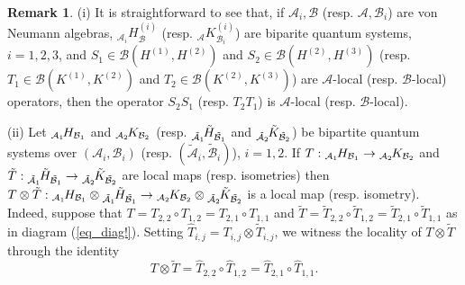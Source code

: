 \documentclass[11pt]{amsart}
\theoremstyle{definition}
\newtheorem{remark}[theorem]{Remark}
\newcommand{\cl}[1]{\mathcal{#1}}
\begin{document}
\begin{remark}\label{r_compo}
(i) It is straightforward to see that, if 
$\cl{A}_i, \cl{B}$ (resp. $\cl{A},\cl{B}_i$) are von Neumann algebras,  
$_{\cl{A}_i}H^{(i)}_{\cl{B}}$ (resp. $_{\cl{A}}K^{(i)}_{\cl{B}_i}$) 
are biparite quantum systems, $i = 1,2,3$, and
$S_1\in\cl B(H^{(1)},H^{(2)})$ and $S_2\in\cl B(H^{(2)},H^{(3)})$
(resp. 
$T_1\in\cl B(K^{(1)},K^{(2)})$ and $T_2\in\cl B(K^{(2)},K^{(3)})$)
are $\cl{A}$-local (resp. $\cl{B}$-local) operators, then the operator $S_2S_1$
(resp. $T_2T_1$) is $\cl{A}$-local (resp. $\cl{B}$-local). 

(ii) 
Let $_{\cl{A}_1}\hspace{-0.05cm}H_{\cl{B}_1}$ and 
$_{\cl{A}_2}\hspace{-0.04cm}K_{\cl{B}_2}$ 
(resp. $_{\tilde{\cl{A}}_1}\hspace{-0.05cm}\tilde{H}_{\tilde{\cl{B}}_1}$ and 
$_{\tilde{\cl{A}}_2}\hspace{-0.04cm}\tilde{K}_{\tilde{\cl{B}}_2}$) 
be bipartite quantum systems over $(\cl{A}_i,\cl{B}_i)$ 
(resp. $(\tilde{\cl{A}}_i,\tilde{\cl{B}}_i)$), $i=1,2$. 
If $T : \mbox{}_{\cl{A}_1}\hspace{-0.04cm}H_{\cl{B}_1}\to \mbox{}_{\cl{A}_2}\hspace{-0.04cm}K_{\cl{B}_2}$ 
and $\tilde{T} : \mbox{}_{\tilde{\cl{A}}_1}\hspace{-0.04cm}\tilde{H}_{\tilde{\cl{B}}_1}\to \mbox{}_{\tilde{\cl{A}}_2}\hspace{-0.04cm}\tilde{K}_{\tilde{\cl{B}}_2}$
are local maps (resp. isometries) then 
$T\otimes \tilde{T} : 
\mbox{}_{\cl{A}_1}\hspace{-0.04cm}H_{\cl{B}_1} \otimes \mbox{}_{\tilde{\cl{A}}_1}\hspace{-0.04cm}\tilde{H}_{\tilde{\cl{B}}_1}
\to 
\mbox{}_{\cl{A}_2}\hspace{-0.04cm}K_{\cl{B}_2} \otimes \mbox{}_{\tilde{\cl{A}}_2}\hspace{-0.04cm}\tilde{K}_{\tilde{\cl{B}}_2}$
is a local map (resp. isometry).
Indeed, suppose that 
$T=T_{2,2}\circ T_{1,2}=T_{2,1}\circ T_{1,1}$ and 
$\tilde{T} = \tilde{T}_{2,2}\circ \tilde{T}_{1,2} 
= \tilde{T}_{2,1}\circ \tilde{T}_{1,1}$ as in diagram (\ref{eq_diag!}). 
Setting $\hat{T}_{i,j} = T_{i,j}\otimes \tilde{T}_{i,j}$, we witness the 
locality of $T\otimes \tilde{T}$ through the identity 
$$T\otimes \tilde{T} = \hat{T}_{2,2}\circ \hat{T}_{1,2}
 = \hat{T}_{2,1}\circ \hat{T}_{1,1}.$$
\end{remark}
\end{document}
